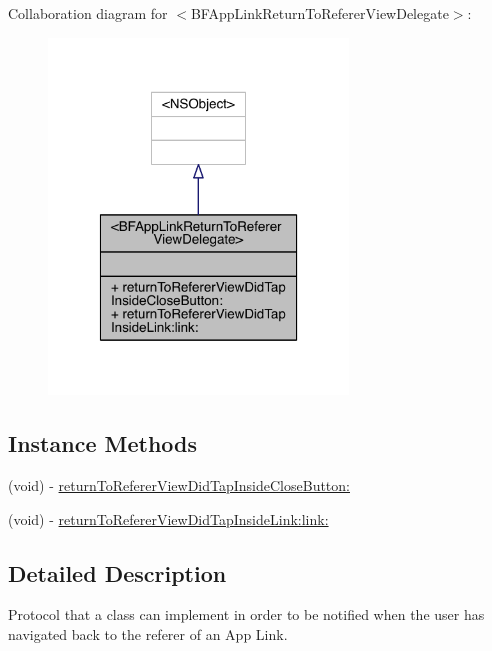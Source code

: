 Collaboration diagram for $<$B\-F\-App\-Link\-Return\-To\-Referer\-View\-Delegate$>$\-:
\nopagebreak
\begin{figure}[H]
\begin{center}
\leavevmode
\includegraphics[width=226pt]{protocol_b_f_app_link_return_to_referer_view_delegate-p__coll__graph}
\end{center}
\end{figure}
\subsection*{Instance Methods}
\begin{DoxyCompactItemize}
\item 
(void) -\/ \hyperlink{protocol_b_f_app_link_return_to_referer_view_delegate-p_ac587dae3654f9804b1ff307e785f439f}{return\-To\-Referer\-View\-Did\-Tap\-Inside\-Close\-Button\-:}
\item 
(void) -\/ \hyperlink{protocol_b_f_app_link_return_to_referer_view_delegate-p_a6e70cea27cddbc4bf47e64ca52213000}{return\-To\-Referer\-View\-Did\-Tap\-Inside\-Link\-:link\-:}
\end{DoxyCompactItemize}


\subsection{Detailed Description}
Protocol that a class can implement in order to be notified when the user has navigated back to the referer of an App Link. 


